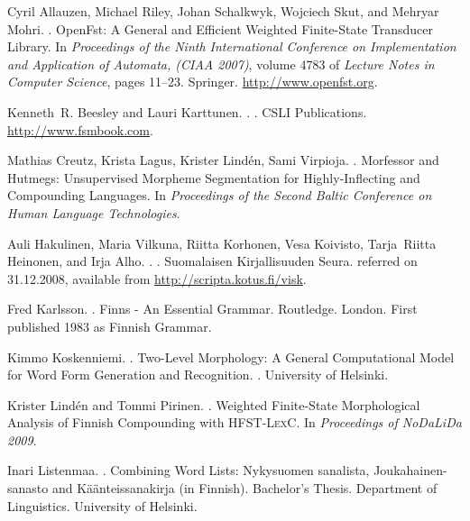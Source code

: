 \documentclass[postprint]{flammie}
\begin{document}
\begin{thebibliography}{14}

Cyril Allauzen, Michael Riley, Johan Schalkwyk, Wojciech Skut, and Mehryar
  Mohri.
.
\newblock Open{F}st: A General and Efficient Weighted Finite-State Transducer
  Library.
\newblock In {\em Proceedings of the Ninth International Conference on
  Implementation and Application of Automata, (CIAA 2007)}, volume 4783 of {\em
  Lecture Notes in Computer Science}, pages 11--23. Springer.
\newblock \url{http://www.openfst.org}.

Kenneth~R. Beesley and Lauri Karttunen.
.
.
\newblock CSLI Publications.
\newblock \url{http://www.fsmbook.com}.

\newblock Mathias Creutz, Krista Lagus, Krister Lindén, Sami Virpioja.
.
\newblock Morfessor and Hutmegs: Unsupervised Morpheme Segmentation for Highly-Inflecting and Compounding Languages.
\newblock In {\em Proceedings of the Second Baltic Conference on Human Language Technologies}.

Auli Hakulinen, Maria Vilkuna, Riitta Korhonen, Vesa Koivisto, Tarja~Riitta
  Heinonen, and Irja Alho.
.
.
\newblock Suomalaisen Kirjallisuuden Seura.
\newblock referred on 31.12.2008, available from
  \url{http://scripta.kotus.fi/visk}.

Fred Karlsson.
.
\newblock Finns - An Essential Grammar.
\newblock Routledge. London. First published 1983 as Finnish Grammar.


Kimmo Koskenniemi.
.
\newblock Two-Level Morphology: A General Computational Model for Word Form Generation and Recognition.
. University of Helsinki.

Krister Lindén and Tommi Pirinen.
.
\newblock Weighted Finite-State Morphological Analysis of Finnish Compounding
with \textsc{HFST-LexC}.
\newblock In {\em Proceedings of NoDaLiDa 2009}.

Inari Listenmaa.
.
\newblock Combining Word Lists: Nykysuomen sanalista, Joukahainen-sanasto 
and Käänteissanakirja (in Finnish). 
\newblock Bachelor’s Thesis. Department of Linguistics. University of Helsinki. 


\end{thebibliography}
\end{document}
